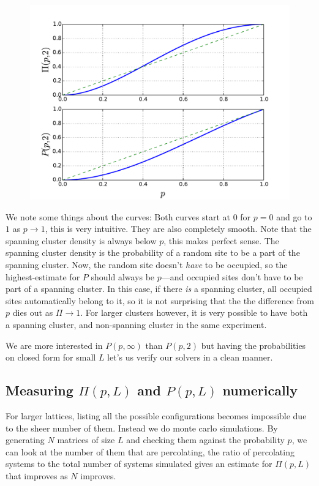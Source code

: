 \documentclass[a4paper, 11pt, notitlepage, english]{article}
\begin{document}
\begin{figure}[ht]
\centering
\includegraphics[width=\textwidth]{11.pdf}
\end{figure}

\newpage
We note some things about the curves: Both curves start at $0$ for $p=0$ and go to $1$ as $p\to 1$, this is very intuitive. They are also completely smooth. Note that the spanning cluster density is always below $p$, this makes perfect sense. The spanning cluster density is the probability of a random site to be a part of the spanning cluster. Now, the random site doesn't \emph{have} to be occupied, so the highest-estimate for $P$ should always be $p$---and occupied sites don't have to be part of a spanning cluster. In this case, if there \emph{is} a spanning cluster, all occupied sites automatically belong to it, so it is not surprising that the the difference from $p$ dies out as $\Pi\to 1$. For larger clusters however, it is very possible to have both a spanning cluster, and non-spanning cluster in the same experiment.

We are more interested in $P(p, \infty)$ than $P(p, 2)$ but having the probabilities on closed form for small $L$ let's us verify our solvers in a clean manner.

\subsection*{Measuring $\Pi(p,L)$ and $P(p, L)$ numerically}

For larger lattices, listing all the possible configurations becomes impossible due to the sheer number of them. Instead we do monte carlo simulations. By generating $N$ matrices of size $L$ and checking them against the probability $p$, we can look at the number of them that are percolating, the ratio of percolating systems to the total number of systems simulated gives an estimate for $\Pi(p,L)$ that improves as $N$ improves.
\end{document}
